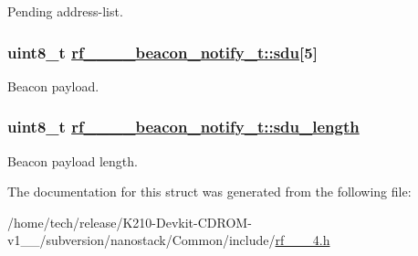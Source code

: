 Pending address-list. \hypertarget{structrf__802__15__4__beacon__notify__t_5af4eff5ea62bc06bda82fc144abf6ed}{
\subsubsection[sdu]{\setlength{\rightskip}{0pt plus 5cm}uint8\_\-t \hyperlink{structrf__802__15__4__beacon__notify__t_5af4eff5ea62bc06bda82fc144abf6ed}{rf\_\_\_\_\-beacon\_\-notify\_\-t::sdu}\mbox{[}5\mbox{]}}}
\label{structrf__802__15__4__beacon__notify__t_5af4eff5ea62bc06bda82fc144abf6ed}


Beacon payload. \hypertarget{structrf__802__15__4__beacon__notify__t_615ecd7915386d4733ba13aa31d6a333}{
\subsubsection[sdu\_\-length]{\setlength{\rightskip}{0pt plus 5cm}uint8\_\-t \hyperlink{structrf__802__15__4__beacon__notify__t_615ecd7915386d4733ba13aa31d6a333}{rf\_\_\_\_\-beacon\_\-notify\_\-t::sdu\_\-length}}}
\label{structrf__802__15__4__beacon__notify__t_615ecd7915386d4733ba13aa31d6a333}


Beacon payload length. 

The documentation for this struct was generated from the following file:\begin{CompactItemize}
\item 
/home/tech/release/K210-Devkit-CDROM-v1\_\_/subversion/nanostack/Common/include/\hyperlink{rf__802__15__4_8h}{rf\_\_\_\-4.h}\end{CompactItemize}
